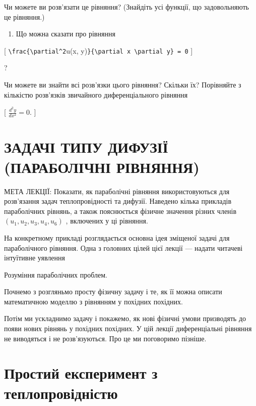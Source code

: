 \documentclass[
]{article}
\providecommand{\tightlist}{%
  \setlength{\itemsep}{0pt}\setlength{\parskip}{0pt}}
\begin{document}
Чи можете ви розв'язати це рівняння? (Знайдіть усі функції, що
задовольняють це рівняння.)

\begin{enumerate}
\def\labelenumi{\arabic{enumi}.}
\setcounter{enumi}{4}
\tightlist
\item
  Що можна сказати про рівняння
\end{enumerate}

{[} \texttt{\textbackslash{}frac\{\textbackslash{}partial\^{}2}u(x,
y)\texttt{\}\{\textbackslash{}partial\ x\ \textbackslash{}partial\ y\}\ =\ 0}
{]}

?

Чи можете ви знайти всі розв'язки цього рівняння? Скільки їх? Порівняйте
з кількістю розв'язків звичайного диференціального рівняння

{[} \(\frac{d^2y}{dx^2} = 0\). {]}

\section{ЗАДАЧІ ТИПУ ДИФУЗІЇ (ПАРАБОЛІЧНІ
РІВНЯННЯ)}\label{ux437ux430ux434ux430ux447ux456-ux442ux438ux43fux443-ux434ux438ux444ux443ux437ux456ux457-ux43fux430ux440ux430ux431ux43eux43bux456ux447ux43dux456-ux440ux456ux432ux43dux44fux43dux43dux44f}

МЕТА ЛЕКЦІЇ: Показати, як параболічні рівняння використовуються для
розв'язання задач теплопровідності та дифузії. Наведено кілька прикладів
параболічних рівнянь, а також пояснюється фізичне значення різних членів
\((u_1, u_2, u_3, u_4, u_6)\) , включених у ці рівняння.

На конкретному прикладі розглядається основна ідея зміщеної задачі для
параболічного рівняння. Одна з головних цілей цієї лекції --- надати
читачеві інтуїтивне уявлення

Розуміння параболічних проблем.

Почнемо з розгляньмо просту фізичну задачу і те, як її можна описати
математичною моделлю з рівнянням у похідних похідних.

Потім ми ускладнимо задачу і покажемо, як нові фізичні умови призводять
до появи нових рівнянь у похідних похідних. У цій лекції диференціальні
рівняння не виводяться і не розв'язуються. Про це ми поговоримо пізніше.

\section{Простий експеримент з
теплопровідністю}\label{ux43fux440ux43eux441ux442ux438ux439-ux435ux43aux441ux43fux435ux440ux438ux43cux435ux43dux442-ux437-ux442ux435ux43fux43bux43eux43fux440ux43eux432ux456ux434ux43dux456ux441ux442ux44e}
\end{document}
